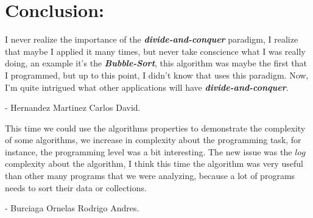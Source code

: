 \section{Conclusion:}

I never realize the importance of the {\bfseries\itshape divide-and-conquer} paradigm, I realize that maybe I applied it many times, but never take conscience what I was really doing, an example it's the {\bfseries\itshape Bubble-Sort}, this algorithm was maybe the first that I programmed, but up to this point, I didn't know that uses this paradigm. Now, I'm quite intrigued what other applications will have {\bfseries\itshape divide-and-conquer}. 

\begin{flushright}
- Hernandez Martinez Carlos David.
\end{flushright} \hfill \break

This time we could use the algorithms properties to demonstrate the complexity of some algorithms, we increase in complexity about the programming task, for instance, the programming level was a bit interesting. The new issue was the $log$ complexity about the algorithm, I think this time the algorithm was very useful than other many programs that we were analyzing, because a lot of programs needs to sort their data or collections.

\begin{flushright}
- Burciaga Ornelas Rodrigo Andres.
\end{flushright} 

\pagebreak